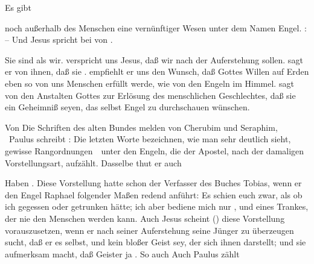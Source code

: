 \begin{aufza}
\item Es gibt
\begin{aufzb}
\item noch außerhalb des Menschen eine  vernünftiger Wesen unter dem Namen Engel. :  -- Und Jesus spricht bei  von .
\item Sie sind  als wir.  verspricht uns Jesus, daß wir nach der Auferstehung  sollen.  sagt er von ihnen, daß sie .  empfiehlt er uns den Wunsch, daß Gottes Willen auf Erden eben so von uns Menschen erfüllt werde, wie von den Engeln im Himmel.  sagt von den Anstalten Gottes zur Erlösung des menschlichen Geschlechtes, daß sie ein Geheimniß seyen, das selbst Engel zu durchschauen wünschen.
\item Von  Die Schriften des alten Bundes melden von Cherubim und Seraphim, \udgl\  Paulus schreibt :  Die letzten Worte bezeichnen, wie man sehr deutlich sieht, gewisse Rangordnungen~\ unter den Engeln, die der Apostel, nach der damaligen Vorstellungsart, aufzählt. Dasselbe thut er  auch 
\item Haben . Diese Vorstellung hatte schon der Verfasser des Buches Tobias, wenn er den Engel Raphael folgender Maßen redend anführt: Es schien euch zwar, als ob ich gegessen oder getrunken hätte; ich aber bediene mich nur , und eines Trankes, der nie den Menschen werden kann. Auch Jesus scheint () diese Vorstellung vorauszusetzen, wenn er nach seiner Auferstehung seine Jünger zu überzeugen sucht, daß er es selbst, und kein bloßer Geist sey, der sich ihnen darstellt; und sie aufmerksam macht, daß Geister ja . So auch  Auch Paulus zählt 

\end{aufzb}
\end{aufza}
